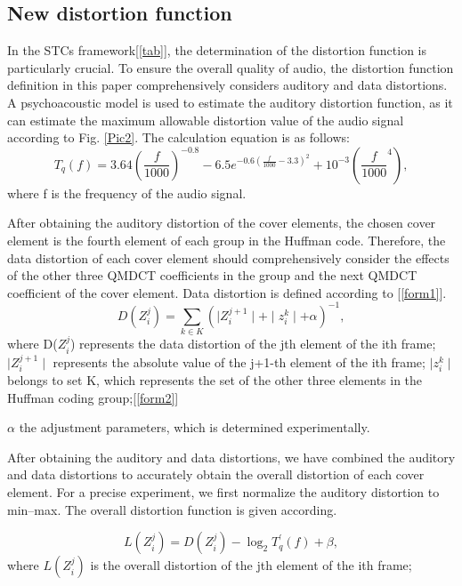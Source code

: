 \documentclass[12pt]{article}
\begin{document}
\subsection{New distortion function}
In the STCs framework[\ref{tab}], the determination of the distortion function is particularly crucial. To ensure the overall quality of audio, the distortion function definition in this paper comprehensively considers auditory and data distortions. A psychoacoustic model is used to estimate the auditory distortion function, as it can estimate the maximum allowable distortion value of the audio signal according to Fig. \ref{Pic2}. The calculation equation is as follows:
\begin{equation}
     T_q (f) = 3.64(\frac{f}{1000})^{-0.8} - 6.5e^{-0.6(\frac{f}{1000} - 3.3)^2} + 10^{-3}(\frac{f}{1000}^4),
     \label{form1}
\end{equation}
where f is the frequency of the audio signal. 

After obtaining the auditory distortion of the cover elements, the chosen cover element is the fourth element of each group in the Huffman code. Therefore, the data distortion of each cover element should comprehensively consider the effects of the other three QMDCT coefficients in the group and the next QMDCT coefficient of the cover element. Data distortion is defined according to [\ref{form1}].
\begin{equation}
    D(Z^j_i) = \sum_{k \in K}( \mid Z^{j+1}_i\mid + \mid z^{k}_i\mid + \alpha)^{-1},
    \label{form2}
\end{equation}
where D($Z^j_i$) represents the data distortion of the jth element of the ith frame;
    $\mid Z^{j+1}_i\mid$  represents the absolute value of the j+1-th element of the ith frame;
    $\mid z^{k}_i\mid$  belongs to set K, which represents the set of the other three elements in the Huffman coding group;[\ref{form2}]
    
    $\alpha$ the adjustment parameters, which is determined experimentally.

    After obtaining the auditory and data distortions, we have combined the auditory and data distortions to accurately obtain the overall distortion of each cover element. For a precise experiment, we first normalize the auditory distortion to min–max. The overall distortion function is given according.

\begin{equation}
    L(Z^j_i) = D(Z^j_i) - \log_2 T^\prime_q (f) + \beta,
    \label{form3}
\end{equation}
    where $L(Z^j_i)$  is the overall distortion of the jth element of the ith frame;
\end{document}
